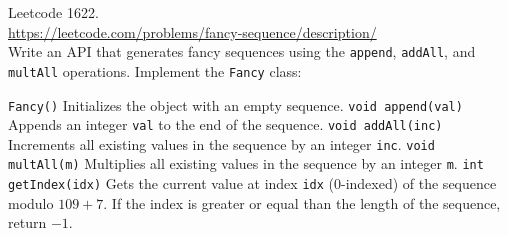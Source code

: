   Leetcode 1622.\\
  \url{https://leetcode.com/problems/fancy-sequence/description/}\\
  Write an API that generates fancy sequences using the
  \texttt{append}, \texttt{addAll}, and \texttt{multAll} operations.
  Implement the \texttt{Fancy} class:
  \begin{enumerate}[nosep]
    \li \texttt{Fancy()} Initializes the object with an empty sequence.
    \li \texttt{void append(val)}
    Appends an integer \texttt{val} to the end of the sequence.
    \li \texttt{void addAll(inc)}
    Increments all existing values in the sequence by an integer \texttt{inc}.
    \li \texttt{void multAll(m)}
    Multiplies all existing values in the sequence by an integer \texttt{m}.
    \li \texttt{int getIndex(idx)}
    Gets the current value at index \texttt{idx} ($0$-indexed)
    of the sequence modulo $109 + 7$.
    If the index is greater or equal than the length of the sequence,
    return $-1$.
\end{enumerate}
